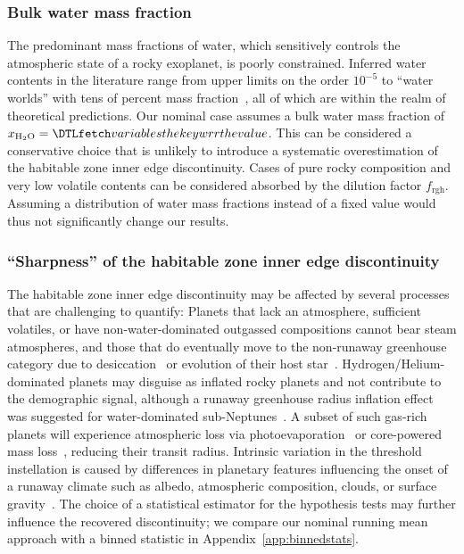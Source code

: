 \documentclass[twocolumn,twocolappendix,linenumbers]{aastex631}
\begin{document}
\subsubsection{Bulk water mass fraction}
The predominant mass fractions of water, which sensitively controls the atmospheric state of a rocky exoplanet, is poorly constrained.
Inferred water contents in the literature range from upper limits on the order $10^{-5}$ to ``water worlds'' with tens of percent mass fraction~\citep[e.g.,][]{Rogers2010,Unterborn2018,Mousis2020,Agol2021,Luque2022}, all of which are within the realm of theoretical predictions.
Our nominal case assumes a bulk water mass fraction of $x_\mathrm{H_2O} = \var{wrr}$.
This can be considered a conservative choice that is unlikely to introduce a systematic overestimation of the habitable zone inner edge discontinuity. %
Cases of pure rocky composition and very low volatile contents can be considered absorbed by the dilution factor $f_\mathrm{rgh}$.
Assuming a distribution of water mass fractions instead of a fixed value would thus not significantly change our results.

\subsubsection{``Sharpness'' of the habitable zone inner edge discontinuity}
The habitable zone inner edge discontinuity may be affected by several processes that are challenging to quantify:
Planets that lack an atmosphere, sufficient volatiles, or have non-water-dominated outgassed compositions cannot bear steam atmospheres, and those that do eventually move to the non-runaway greenhouse category due to desiccation~\citep[][]{Watson1981,Kasting1983,Hamano2013} or evolution of their host star~\citep{Luger2015}.
Hydrogen/Helium-dominated planets may disguise as inflated rocky planets and not contribute to the demographic signal, although a runaway greenhouse radius inflation effect was suggested for water-dominated sub-Neptunes~\citep{Pierrehumbert2022,Innes2023}.
A subset of such gas-rich planets will experience atmospheric loss via photoevaporation~\citep{Owen2013} or core-powered mass loss~\citep{Ginzburg2018}, reducing their transit radius.
Intrinsic variation in the threshold instellation is caused by differences in planetary features influencing the onset of a runaway climate such as albedo, atmospheric composition, clouds, or surface gravity~\citep{Salvador2017,Turbet2021,Lichtenberg2021c,Pierrehumbert2022,Innes2023}.
The choice of a statistical estimator for the hypothesis tests may further influence the recovered discontinuity; we compare our nominal running mean approach with a binned statistic in Appendix~\ref{app:binnedstats}.
\end{document}

